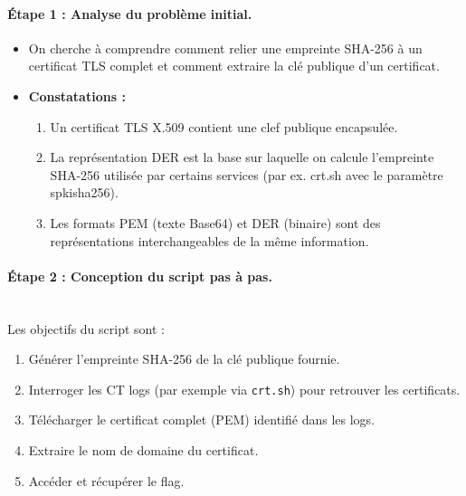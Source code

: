 \documentclass[12pt, a4paper]{article}
\begin{document}
    \paragraph{\textbf{Étape 1 : Analyse du problème initial.}}
    \begin{itemize}
        \item On cherche à comprendre comment relier une empreinte SHA-256 à un
              certificat TLS complet et comment extraire la clé publique d'un
              certificat.
        \item \textbf{Constatations :}
        \begin{enumerate}
            \item Un certificat TLS X.509 contient une clef publique encapsulée.
            \item La représentation DER est la base sur laquelle on calcule
                  l'empreinte SHA-256 utilisée par certains services (par ex.
                  crt.sh avec le paramètre spkisha256).
            \item Les formats PEM (texte Base64) et DER (binaire) sont des
                  représentations interchangeables de la même information.
        \end{enumerate}
    \end{itemize}

    \paragraph{\textbf{Étape 2 : Conception du script pas à pas.}}~\\
    Les objectifs du script sont :
    \begin{enumerate}
        \item Générer l'empreinte SHA-256 de la clé publique fournie.
        \item Interroger les CT logs (par exemple via \texttt{crt.sh}) pour
              retrouver les certificats.
        \item Télécharger le certificat complet (PEM) identifié dans les logs.
        \item Extraire le nom de domaine du certificat.
        \item Accéder et récupérer le flag.
    \end{enumerate}
\end{document}
